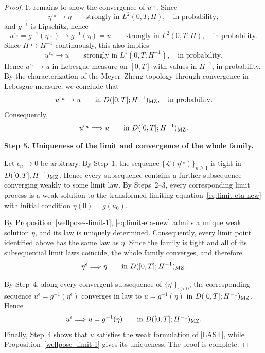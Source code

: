 \documentclass[11pt]{article}
\theoremstyle{plain}
\numberwithin{equation}{section}
\begin{document}
\begin{proof}
It remains to show the convergence of \(u^{\epsilon_n}\). Since
\[
\eta^{\epsilon_n}\to\eta
\qquad
\text{strongly in }L^2(0,T;H),
\quad
\text{in probability},
\]
and \(g^{-1}\) is Lipschitz,  hence
\[
u^{\epsilon_n}=g^{-1}(\eta^{\epsilon_n})
\to
g^{-1}(\eta)
=
u
\qquad
\text{strongly in }L^2(0,T;H),
\quad
\text{in probability}.
\]
Since \(H\hookrightarrow H^{-1}\) continuously, this also implies
\[
u^{\epsilon_n}\to u
\qquad
\text{strongly in }L^1(0,T;H^{-1}),
\quad
\text{in probability}.
\]
Hence \(u^{\epsilon_n}\to u\) in Lebesgue measure on \([0,T]\) with values
in \(H^{-1}\), in probability. By the characterization of the
Meyer--Zheng topology through convergence in Lebesgue measure, we conclude
that
\[
u^{\epsilon_n}\to u
\qquad
\text{in }D([0,T];H^{-1})_{\rm MZ},
\quad
\text{in probability}.
\]
Consequently,
\[
u^{\epsilon_n}
\Longrightarrow
u
\qquad
\text{in }D([0,T];H^{-1})_{\rm MZ}.
\]
 

\medskip
\noindent\textbf{Step 5. Uniqueness of the limit and convergence of the whole family.}

Let \(\epsilon_n\to0\) be arbitrary. By Step~1, the sequence
\(\{\mathcal L(\eta^{\epsilon_n})\}_{n\ge1}\) is tight in
\(D([0,T];H^{-1})_{\rm MZ}\). Hence every subsequence contains a further
subsequence converging weakly to some limit law. By Steps~2--3, every
corresponding limit process is a weak solution to the transformed limiting
equation~\eqref{eq:limit-eta-new} with initial condition
\(\eta(0)=g(u_0)\).

By Proposition~\ref{wellpose--limit-1},
\eqref{eq:limit-eta-new} admits a unique weak solution \(\eta\), and its
law is uniquely determined. Consequently, every limit point identified
above has the same law as \(\eta\). Since the family is tight and all of
its subsequential limit laws coincide, the whole family converges, and
therefore
\[
\eta^\epsilon\Longrightarrow\eta \qquad\text{in }D([0,T];H^{-1})_{\rm MZ}.
\]

By Step~4, along every convergent subsequence of
\(\{\eta^\epsilon\}_{\epsilon>0}\), the corresponding sequence
\(u^\epsilon=g^{-1}(\eta^\epsilon)\) converges in law to
\(u=g^{-1}(\eta)\) in \(D([0,T];H^{-1})_{\rm MZ}\). Hence
\[
u^\epsilon\Longrightarrow u=g^{-1}(\eta) \qquad\text{in }D([0,T];H^{-1})_{\rm MZ}.
\]
Finally, Step~4 shows that \(u\) satisfies the weak formulation of
\eqref{LAST}, while Proposition~\ref{wellpose--limit-1} gives its
uniqueness. The proof is complete. 
 
 
 

\end{proof}
\end{document}

